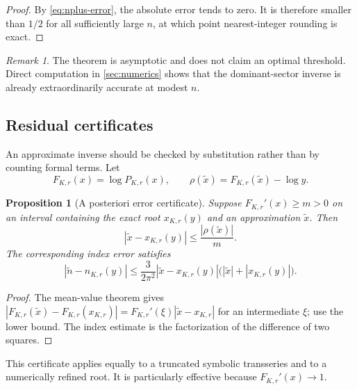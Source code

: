 \documentclass[11pt,a4paper]{article}
\numberwithin{equation}{section}
\newtheorem{proposition}[theorem]{Proposition}
\theoremstyle{remark}
\newtheorem{remark}[theorem]{Remark}
\begin{document}
\begin{proof}
By \cref{eq:nplus-error}, the absolute error tends to zero.  It is therefore smaller than $1/2$ for all sufficiently large $n$, at which point nearest-integer rounding is exact.
\end{proof}

\begin{remark}
The theorem is asymptotic and does not claim an optimal threshold.  Direct computation in \cref{sec:numerics} shows that the dominant-sector inverse is already extraordinarily accurate at modest $n$.
\end{remark}

\subsection{Residual certificates}

An approximate inverse should be checked by substitution rather than by counting formal terms.  Let
\begin{equation}
 F_{K,r}(x)=\log P_{K,r}(x),\qquad
 \rho(\widetilde x)=F_{K,r}(\widetilde x)-\log y.
\end{equation}

\begin{proposition}[A posteriori error certificate]\label{prop:residual-certificate}
Suppose $F_{K,r}'(x)\ge m>0$ on an interval containing the exact root $x_{K,r}(y)$ and an approximation $\widetilde x$.  Then
\begin{equation}\label{eq:residual-bound}
 |\widetilde x-x_{K,r}(y)|\le\frac{|\rho(\widetilde x)|}{m}.
\end{equation}
The corresponding index error satisfies
\begin{equation}\label{eq:residual-index-bound}
 |\widetilde n-n_{K,r}(y)|
 \le \frac{3}{2\pi^2}
 |\widetilde x-x_{K,r}(y)|
 \bigl(|\widetilde x|+|x_{K,r}(y)|\bigr).
\end{equation}
\end{proposition}

\begin{proof}
The mean-value theorem gives
$|F_{K,r}(\widetilde x)-F_{K,r}(x_{K,r})|
=F_{K,r}'(\xi)|\widetilde x-x_{K,r}|$ for an intermediate $\xi$; use the lower bound.  The index estimate is the factorization of the difference of two squares.
\end{proof}

This certificate applies equally to a truncated symbolic transseries and to a numerically refined root.  It is particularly effective because $F_{K,r}'(x)\to1$.
\end{document}
